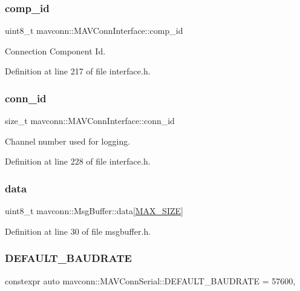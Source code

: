\subsubsection{\texorpdfstring{comp\_id}{comp\_id}}
{\footnotesize\ttfamily uint8\+\_\+t mavconn\+::\+M\+A\+V\+Conn\+Interface\+::comp\+\_\+id\hspace{0.3cm}{\ttfamily [protected]}}



Connection Component Id. 



Definition at line 217 of file interface.\+h.

\mbox{\label{group__mavconn_gab5e1164e0e16a986b4b8b07ac42149e5}} 
\subsubsection{\texorpdfstring{conn\_id}{conn\_id}}
{\footnotesize\ttfamily size\+\_\+t mavconn\+::\+M\+A\+V\+Conn\+Interface\+::conn\+\_\+id\hspace{0.3cm}{\ttfamily [protected]}}



Channel number used for logging. 



Definition at line 228 of file interface.\+h.

\mbox{\label{group__mavconn_gafac3ddb58cafe6448ff6f046a73a66a5}} 
\subsubsection{\texorpdfstring{data}{data}}
{\footnotesize\ttfamily uint8\+\_\+t mavconn\+::\+Msg\+Buffer\+::data\mbox{[}\mbox{\hyperlink{group__mavconn_ga7187a6a6dd41cfe0e92d2c59c81a0010}{M\+A\+X\+\_\+\+S\+I\+ZE}}\mbox{]}}



Definition at line 30 of file msgbuffer.\+h.

\mbox{\label{group__mavconn_gaf0dd28c4a6b236f2ec3092a1b35ff5df}} 
\subsubsection{\texorpdfstring{DEFAULT\_BAUDRATE}{DEFAULT\_BAUDRATE}}
{\footnotesize\ttfamily constexpr auto mavconn\+::\+M\+A\+V\+Conn\+Serial\+::\+D\+E\+F\+A\+U\+L\+T\+\_\+\+B\+A\+U\+D\+R\+A\+TE = 57600\hspace{0.3cm}{\ttfamily [static]}, {\ttfamily [constexpr]}}



